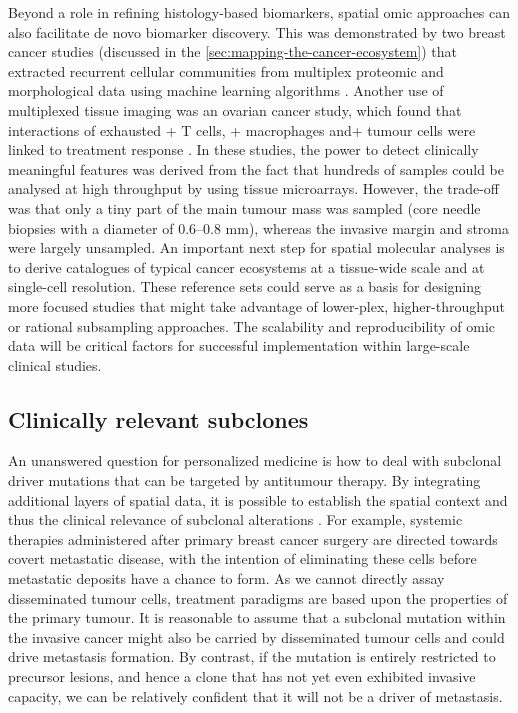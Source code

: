 Beyond a role in refining histology-based biomarkers, spatial omic approaches can also facilitate de novo biomarker discovery. This was demonstrated by two breast cancer studies (discussed in the \cref{sec:mapping-the-cancer-ecosystem}) that extracted recurrent cellular communities from multiplex proteomic and morphological data using machine learning algorithms \parencite{Danenberg2022-zb,Jackson2020-em}. Another use of multiplexed tissue imaging was an ovarian cancer study, which found that interactions of exhausted + T cells, + macrophages and+ tumour cells were linked to treatment response \parencite{Farkkila2020-gk}. In these studies, the power to detect clinically meaningful features was derived from the fact that hundreds of samples could be analysed at high throughput by using tissue microarrays. However, the trade-off was that only a tiny part of the main tumour mass was sampled (core needle biopsies with a diameter of 0.6–0.8 mm), whereas the invasive margin and stroma were largely unsampled. An important next step for spatial molecular analyses is to derive catalogues of typical cancer ecosystems at a tissue-wide scale and at single-cell resolution. These reference sets could serve as a basis for designing more focused studies that might take advantage of lower-plex, higher-throughput or rational subsampling approaches. The scalability and reproducibility of omic data will be critical factors for successful implementation within large-scale clinical studies.

\subsection*{Clinically relevant subclones}
An unanswered question for personalized medicine is how to deal with subclonal driver mutations that can be targeted by antitumour therapy. By integrating additional layers of spatial data, it is possible to establish the spatial context and thus the clinical relevance of subclonal alterations \parencite{Lomakin2022-ks,Gonzalez-Silva2020-fn} . For example, systemic therapies administered after primary breast cancer surgery are directed towards covert metastatic disease, with the intention of eliminating these cells before metastatic deposits have a chance to form. As we cannot directly assay disseminated tumour cells, treatment paradigms are based upon the properties of the primary tumour. It is reasonable to assume that a subclonal mutation within the invasive cancer might also be carried by disseminated tumour cells and could drive metastasis formation. By contrast, if the mutation is entirely restricted to precursor lesions, and hence a clone that has not yet even exhibited invasive capacity, we can be relatively confident that it will not be a driver of metastasis.

